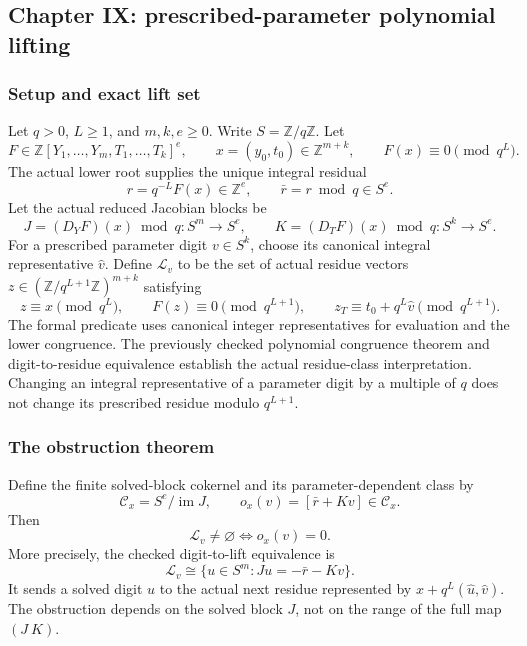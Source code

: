 \hypertarget{cont8:paper-ix-prescribed-parameter-polynomial-lifting}{%
\subsection{Chapter IX: prescribed-parameter polynomial
lifting}\label{cont8:paper-ix-prescribed-parameter-polynomial-lifting}}

\hypertarget{cont8:setup-and-exact-lift-set}{%
\subsubsection{Setup and exact lift
set}\label{cont8:setup-and-exact-lift-set}}

Let \(q>0\), \(L\ge1\), and \(m,k,e\ge0\). Write
\(S=\mathbb Z/q\mathbb Z\). Let \[
F\in\mathbb Z[Y_1,\ldots,Y_m,T_1,\ldots,T_k]^e,
\qquad x=(y_0,t_0)\in\mathbb Z^{m+k},
\qquad F(x)\equiv0\pmod{q^L}.
\] The actual lower root supplies the unique integral residual \[
r=q^{-L}F(x)\in\mathbb Z^e,\qquad \bar r=r\bmod q\in S^e.
\] Let the actual reduced Jacobian blocks be \[
J=(D_YF)(x)\bmod q:S^m\to S^e,
\qquad K=(D_TF)(x)\bmod q:S^k\to S^e.
\] For a prescribed parameter digit \(v\in S^k\), choose its canonical
integral representative \(\widehat v\). Define \(\mathcal L_v\) to be
the set of actual residue vectors
\(z\in(\mathbb Z/q^{L+1}\mathbb Z)^{m+k}\) satisfying \[
z\equiv x\pmod{q^L},\qquad F(z)\equiv0\pmod{q^{L+1}},\qquad
z_T\equiv t_0+q^L\widehat v\pmod{q^{L+1}}.
\] The formal predicate uses canonical integer representatives for
evaluation and the lower congruence. The previously checked polynomial
congruence theorem and digit-to-residue equivalence establish the actual
residue-class interpretation. Changing an integral representative of a
parameter digit by a multiple of \(q\) does not change its prescribed
residue modulo \(q^{L+1}\).

\hypertarget{cont8:the-obstruction-theorem}{%
\subsubsection{The obstruction theorem}\label{cont8:the-obstruction-theorem}}

Define the finite solved-block cokernel and its parameter-dependent
class by \[
\mathcal C_x=S^e/\operatorname{im}J,
\qquad o_x(v)=[\bar r+Kv]\in\mathcal C_x.
\] Then \[
\boxed{\mathcal L_v\ne\varnothing\iff o_x(v)=0.}
\] More precisely, the checked digit-to-lift equivalence is \[
\boxed{\mathcal L_v\cong\{u\in S^m:Ju=-\bar r-Kv\}.}
\] It sends a solved digit \(u\) to the actual next residue represented
by \(x+q^L(\widehat u,\widehat v)\). The obstruction depends on the
solved block \(J\), not on the range of the full map \((J\ K)\).

